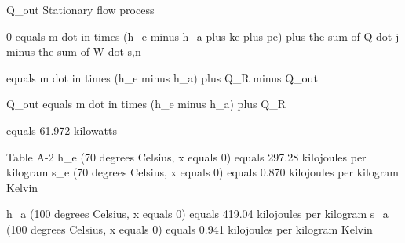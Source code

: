 Q_out  
Stationary flow process  

0 equals m dot in times (h_e minus h_a plus ke plus pe) plus the sum of Q dot j minus the sum of W dot s,n  

equals m dot in times (h_e minus h_a) plus Q_R minus Q_out  

Q_out equals m dot in times (h_e minus h_a) plus Q_R  

equals 61.972 kilowatts  

Table A-2  
h_e (70 degrees Celsius, x equals 0) equals 297.28 kilojoules per kilogram  
s_e (70 degrees Celsius, x equals 0) equals 0.870 kilojoules per kilogram Kelvin  

h_a (100 degrees Celsius, x equals 0) equals 419.04 kilojoules per kilogram  
s_a (100 degrees Celsius, x equals 0) equals 0.941 kilojoules per kilogram Kelvin